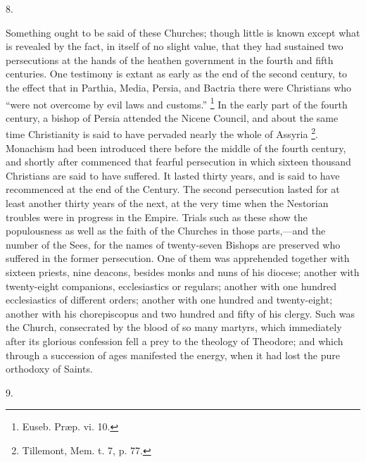8.

Something ought to be said of these Churches; though little is
known except what is revealed by the fact, in itself of no slight
value, that they had sustained two persecutions at the hands of the
heathen government in the fourth and fifth centuries. One testimony is
extant as early as the end of the second century, to the effect that
in Parthia, Media, Persia, and Bactria there were Christians who
``were not overcome by evil laws and customs.'' \footnote{Euseb. Præp. vi. 10.} In the early part of the fourth century, a bishop of Persia
attended the Nicene Council, and about the same time Christianity is
said to have pervaded nearly the whole of Assyria \footnote{Tillemont, Mem. t. 7, p. 77.}. Monachism had been introduced there before the middle of the
fourth century, and shortly after commenced that fearful persecution
in which sixteen thousand Christians are said to have suffered. It
lasted thirty years, and is said to have recommenced at the end of the
Century. The second persecution lasted for at least another thirty
years of the next, at the very time when the Nestorian troubles were
in progress in the Empire. Trials such as these show the populousness
as well as the faith of the Churches in those parts,—and the number
of the Sees, for the names of twenty-seven Bishops are preserved who
suffered in the former persecution. One of them was apprehended
together with sixteen priests, nine deacons, besides monks and nuns of
his diocese; another with twenty-eight companions, ecclesiastics or
regulars; another with one hundred ecclesiastics of different orders;
another with one hundred and twenty-eight; another with his
chorepiscopus and two hundred and fifty of his clergy. Such was the
Church, consecrated by the blood of so many martyrs, which immediately
after its glorious confession fell a prey to the theology of Theodore;
and which through a succession of ages manifested the energy, when it
had lost the pure orthodoxy of Saints.

9.

